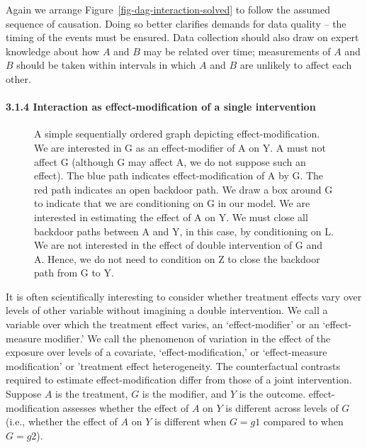 \documentclass[
  singlecolumn]{article}
\let\oldparagraph\paragraph
\renewcommand{\paragraph}[1]{\oldparagraph{#1}\mbox{}}
\begin{document}
Again we arrange Figure~\ref{fig-dag-interaction-solved} to follow the
assumed sequence of causation. Doing so better clarifies demands for
data quality -- the timing of the events must be ensured. Data
collection should also draw on expert knowledge about how \(A\) and
\(B\) may be related over time; measurements of \(A\) and \(B\) should
be taken within intervals in which \(A\) and \(B\) are unlikely to
affect each other.

\paragraph{3.1.4 Interaction as effect-modification of a single
intervention}\label{interaction-as-effect-modification-of-a-single-intervention}

\begin{figure}


\caption{\label{fig-dag-effect-modification}A simple sequentially
ordered graph depicting effect-modification. We are interested in G as
an effect-modifier of A on Y. A must not affect G (although G may affect
A, we do not suppose such an effect). The blue path indicates
effect-modification of A by G. The red path indicates an open backdoor
path. We draw a box around G to indicate that we are conditioning on G
in our model. We are interested in estimating the effect of A on Y. We
must close all backdoor paths between A and Y, in this case, by
conditioning on L. We are not interested in the effect of double
intervention of G and A. Hence, we do not need to condition on Z to
close the backdoor path from G to Y.}

\end{figure}%

It is often scientifically interesting to consider whether treatment
effects vary over levels of other variable without imagining a double
intervention. We call a variable over which the treatment effect varies,
an `effect-modifier' or an `effect-measure modifier.' We call the
phenomenon of variation in the effect of the exposure over levels of a
covariate, `effect-modification,' or `effect-measure modification' or
'treatment effect heterogeneity. The counterfactual contrasts required
to estimate effect-modification differ from those of a joint
intervention. Suppose \(A\) is the treatment, \(G\) is the modifier, and
\(Y\) is the outcome. effect-modification assesses whether the effect of
\(A\) on \(Y\) is different across levels of \(G\) (i.e., whether the
effect of \(A\) on \(Y\) is different when \(G = g1\) compared to when
\(G = g2\)).
\end{document}
